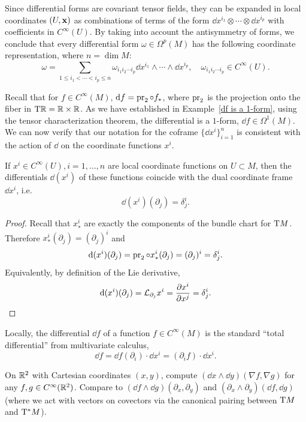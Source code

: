 \begin{rem}
    Since differential forms are covariant tensor fields, they can be expanded in local coordinates $(U,\bf{x})$ as combinations of terms of the form $\dd x^{i_1}\otimes\cdots\otimes \dd x^{i_p}$ with coefficients in $C^\infty(U)$. By taking into account the antisymmetry of forms, we conclude that every differential form $\omega\in\Omega^p(M)$ has the following coordinate representation, where $n=\dim M$:
    \[\omega=\sum_{1\leq i_1<\cdots <i_p\leq n}\omega_{i_1 i_2\cdots i_p}\dd x^{i_1}\wedge\cdots\wedge \dd x^{i_p},\quad \omega_{i_1 i_2\cdots i_p}\in C^\infty(U).\label{eq local rep of a p-form}\]
\end{rem}


Recall that for $f\in C^\infty(M)$, $\dd f=\pr_2\circ f_\ast$, where $\pr_2$ is the projection onto the fiber in $\T\bbR =\bbR \times\bbR $. As we have established in Example~\ref{df is a 1-form}, using the tensor characterization theorem, the differential is a $1$-form, $\dd f\in\Omega^1(M)$. We can now verify that our notation for the coframe $\{\dd x^i\}_{i=1}^n$ is consistent with the action of $\dd$ on the coordinate functions $x^i$.

\begin{prop}
    If $x^i\in C^\infty(U),i=1,\ldots,n$ are local coordinate functions on $U\subset M$, then the differentials $\dd (x^i)$ of these functions coincide with the dual coordinate frame $\dd x^i$, i.e.
    \[\dd (x^i)(\partial_j)=\delta^i_j.\]
\end{prop}
\begin{proof}
    Recall that $x^i_\ast$ are exactly the components of the bundle chart for $\T M$. Therefore $x^i_\ast(\partial_j)=(\partial_j)^i$ and
    \[\dd (x^i)(\partial_{j})=\pr_2\circ x^i_\ast (\partial_{j})=(\partial_j)^i=\delta^i_j.\]
    Equivalently, by definition of the Lie derivative, 
    \[\dd (x^i)(\partial_j)=\Lie_{\partial_j}x^i=\frac{\partial x^i}{\partial x^j}=\delta^i_j.\]
\end{proof}
\begin{cor}
    Locally, the differential $\dd f$ of a function $f\in C^\infty(M)$ is the standard ``total differential'' from multivariate calculus, \[\dd f=\dd f(\partial_i)\cdot\dd x^i=(\partial_i f)\cdot \dd x^i.\]
\end{cor}

\begin{xca}
    On $\bbR^2$ with Cartesian coordinates $(x,y)$, compute $(\dd x\wedge \dd y)(\nabla f,\nabla g)$ for any $f,g\in C^\infty(\bbR^2)$. Compare to $(\dd f\wedge \dd g)(\partial_x,\partial_y)$ and $(\partial_x\wedge\partial_y)(\dd f,\dd g)$ (where we act with vectors on covectors via the canonical pairing between $\T M$ and $\T^\ast M$).
\end{xca}

